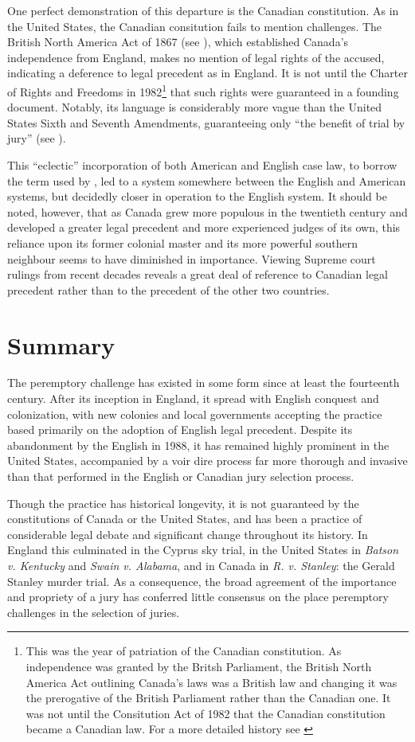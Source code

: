 One perfect demonstration of this departure is the Canadian constitution. As in the United States, the Canadian consitution fails
to mention challenges. The British North America Act of 1867 (see \cite{canadaconst}), which established Canada's independence from
England, makes no mention of legal rights of the accused, indicating a deference to legal precedent as in England. It is not until
the Charter of Rights and Freedoms in 1982\footnote{This was the year of patriation of the Canadian constitution. As
  independence was granted by the Britsh Parliament, the British North America Act outlining Canada's laws was a British law and
  changing it was the prerogative of the British Parliament rather than the Canadian one. It was not until the Consitution Act of
  1982 that the Canadian constitution became a Canadian law. For a more detailed history see \cite{sheppard2018}} that such rights
were guaranteed in a founding document. Notably, its language is considerably more vague than the United States Sixth and Seventh
Amendments, guaranteeing only ``the benefit of trial by jury'' (see \cite{canadaconst}).

This ``eclectic'' incorporation of both American and English case law, to borrow the term used by \cite{brown2000}, led to a
system somewhere between the English and American systems, but decidedly closer in operation to the English system. It should be
noted, however, that as Canada grew more populous in the twentieth century and developed a greater legal precedent and more
experienced judges of its own, this reliance upon its former colonial master and its more powerful southern neighbour seems to
have diminished in importance. Viewing Supreme court rulings from recent decades reveals a great deal of reference to Canadian
legal precedent rather than to the precedent of the other two countries.

\section{Summary}

The peremptory challenge has existed in some form since at least the fourteenth century. After its inception in England, it spread
with English conquest and colonization, with new colonies and local governments accepting the practice based primarily on the
adoption of English legal precedent. Despite its abandonment by the English in 1988, it has remained highly prominent in the
United States, accompanied by a voir dire process far more thorough and invasive than that performed in the English or Canadian
jury selection process.

Though the practice has historical longevity, it is not guaranteed by the constitutions of Canada or the United States, and has
been a practice of considerable legal debate and significant change throughout its history. In England this culminated in the
Cyprus sky trial, in the United States in \textit{Batson v. Kentucky} and \textit{Swain v. Alabama}, and in Canada in
\textit{R. v. Stanley}: the Gerald Stanley  murder trial. As a consequence, the broad agreement of the importance and propriety of
a jury has conferred little consensus on the place peremptory challenges in the selection of juries.
